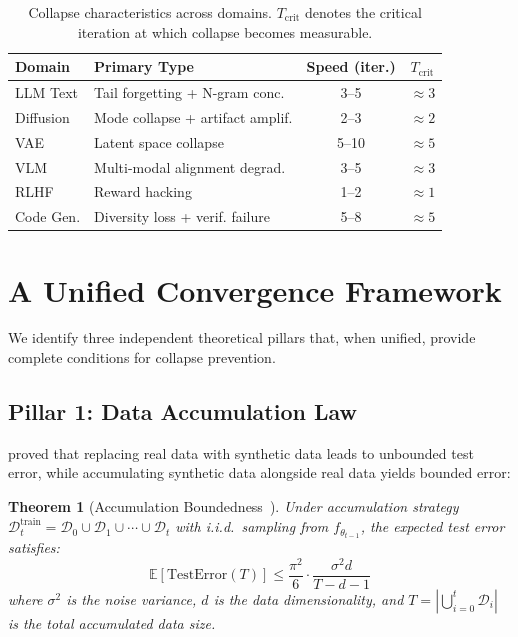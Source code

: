 \documentclass[11pt]{article}
\newtheorem{theorem}{Theorem}
\newcommand{\E}{\mathbb{E}}
\newcommand{\cD}{\mathcal{D}}
\begin{document}
\begin{table}[t]
\centering
\small
\begin{tabular}{@{}llcc@{}}
\toprule
\textbf{Domain} & \textbf{Primary Type} & \textbf{Speed (iter.)} & $T_{\mathrm{crit}}$ \\
\midrule
LLM Text & Tail forgetting + N-gram conc. & 3--5 & $\approx 3$ \\
Diffusion & Mode collapse + artifact amplif. & 2--3 & $\approx 2$ \\
VAE & Latent space collapse & 5--10 & $\approx 5$ \\
VLM & Multi-modal alignment degrad. & 3--5 & $\approx 3$ \\
RLHF & Reward hacking & 1--2 & $\approx 1$ \\
Code Gen. & Diversity loss + verif. failure & 5--8 & $\approx 5$ \\
\bottomrule
\end{tabular}
\caption{Collapse characteristics across domains. $T_{\mathrm{crit}}$ denotes the critical iteration at which collapse becomes measurable.}
\label{tab:domains}
\end{table}

\section{A Unified Convergence Framework}
\label{sec:framework}

We identify three independent theoretical pillars that, when unified, provide complete conditions for collapse prevention.

\subsection{Pillar 1: Data Accumulation Law}

\citet{gerstgrasser2024model} proved that replacing real data with synthetic data leads to unbounded test error, while accumulating synthetic data alongside real data yields bounded error:

\begin{theorem}[Accumulation Boundedness~\citep{gerstgrasser2024model}]
\label{thm:accum}
Under accumulation strategy $\cD_t^{\mathrm{train}} = \cD_0 \cup \cD_1 \cup \cdots \cup \cD_t$ with i.i.d.\ sampling from $f_{\theta_{t-1}}$, the expected test error satisfies:
\begin{equation}
    \E[\mathrm{TestError}(T)] \leq \frac{\pi^2}{6} \cdot \frac{\sigma^2 d}{T - d - 1}
\end{equation}
where $\sigma^2$ is the noise variance, $d$ is the data dimensionality, and $T = |\bigcup_{i=0}^{t} \cD_i|$ is the total accumulated data size.
\end{theorem}
\end{document}
